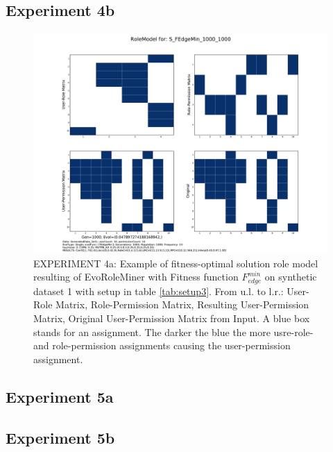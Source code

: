 \subsection{Experiment 4b}
\label{sec:experiment4b}
	\begin{figure}[H]
		\centering
		\includegraphics[scale=0.37, trim=4cm 2cm 4cm 2cm, clip=true]{./Figures/exp4bEdge_RM}
		\caption{EXPERIMENT 4a: Example of fitness-optimal solution role model resulting of EvoRoleMiner with Fitness function $F_{edge}^{min}$ on synthetic dataset 1 with setup in table \ref{tab:setup3}. From u.l. to l.r.: User-Role Matrix, Role-Permission Matrix, Resulting User-Permission Matrix, Original User-Permission Matrix from Input. A blue box stands for an assignment. The darker the blue the more usre-role- and role-permission assignments causing the user-permission assignment.}
		\label{fig:exp4bEdge_RM}
	\end{figure}


\subsection{Experiment 5a}

\subsection{Experiment 5b}